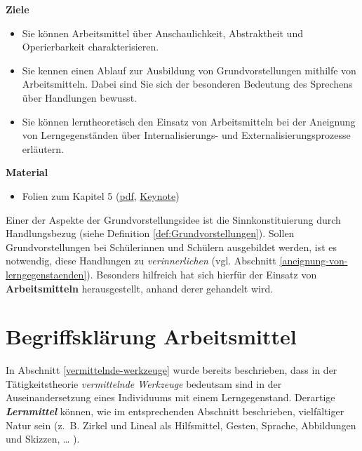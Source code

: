 \documentclass[
]{scrbook}
\providecommand{\tightlist}{%
  \setlength{\itemsep}{0pt}\setlength{\parskip}{0pt}}
\renewenvironment{quote}{
  \list{}{
	\leftmargin0.2cm   %
    \rightmargin\leftmargin
      	\def\FrameCommand
    {%
        {\color{quoteColor}\vrule width 2pt}%
        \hspace{0pt}%
    }%
    \MakeFramed{\advance \hsize -\width \FrameRestore}    \color{quoteColor}
    }
  \item\relax
}
{\endlist\color{black}\endMakeFramed}
\theoremstyle{definition}
\theoremstyle{definition}
\theoremstyle{definition}
\theoremstyle{definition}
\theoremstyle{remark}
\begin{document}
\begin{quote}
\textbf{Ziele}

\begin{itemize}
\tightlist
\item
  Sie können Arbeitsmittel über Anschaulichkeit, Abstraktheit und Operierbarkeit charakterisieren.
\item
  Sie kennen einen Ablauf zur Ausbildung von Grundvorstellungen mithilfe von Arbeitsmitteln. Dabei sind Sie sich der besonderen Bedeutung des Sprechens über Handlungen bewusst.
\item
  Sie können lerntheoretisch den Einsatz von Arbeitsmitteln bei der Aneignung von Lerngegenständen über Internalisierungs- und Externalisierungsprozesse erläutern.
\end{itemize}

\textbf{Material}

\begin{itemize}
\tightlist
\item
  Folien zum Kapitel 5 (\href{files/Stoffdidaktik2024-08-Arbeitsmittel.pdf}{pdf}, \href{files/Stoffdidaktik2024-08-Arbeitsmittel.key}{Keynote})
\end{itemize}
\end{quote}

Einer der Aspekte der Grundvorstellungsidee ist die Sinnkonstituierung durch Handlungsbezug (siehe Definition \ref{def:Grundvorstellungen}). Sollen Grundvorstellungen bei Schülerinnen und Schülern ausgebildet werden, ist es notwendig, diese Handlungen zu \emph{verinnerlichen} (vgl. Abschnitt \ref{aneignung-von-lerngegenstaenden}). Besonders hilfreich hat sich hierfür der Einsatz von \textbf{Arbeitsmitteln} herausgestellt, anhand derer gehandelt wird.

\section{Begriffsklärung Arbeitsmittel}\label{arbeitsmittel-begriffsklaerung}

In Abschnitt \ref{vermittelnde-werkzeuge} wurde bereits beschrieben, dass in der Tätigkeitstheorie \emph{vermittelnde Werkzeuge} bedeutsam sind in der Auseinandersetzung eines Individuums mit einem Lerngegenstand. Derartige \textbf{\emph{Lernmittel}} können, wie im entsprechenden Abschnitt beschrieben, vielfältiger Natur sein (z.~B. Zirkel und Lineal als Hilfsmittel, Gesten, Sprache, Abbildungen und Skizzen, \ldots{} ).
\end{document}
